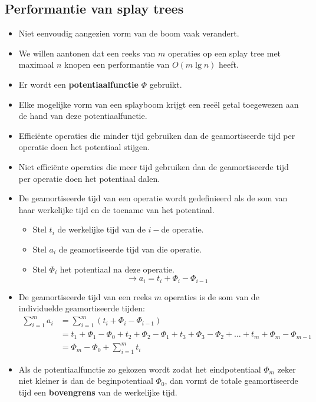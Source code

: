 \subsection{Performantie van splay trees}
\begin{itemize}
    \item Niet eenvoudig aangezien vorm van de boom vaak verandert.
    \item We willen aantonen dat een reeks van $m$ operaties op een splay tree met maximaal $n$ knopen een performantie van $O(m\lg n)$ heeft.
    \item Er wordt een \textbf{potentiaalfunctie} $\Phi$ gebruikt.
    \item Elke mogelijke vorm van een splayboom krijgt een reeël getal toegewezen aan de hand van deze potentiaalfunctie.
    \item Efficiënte operaties die minder tijd gebruiken dan de geamortiseerde tijd per operatie doen het potentiaal stijgen.
    \item Niet efficiënte operaties die meer tijd gebruiken dan de geamortiseerde tijd per operatie doen het potentiaal dalen.
    \item De geamortiseerde tijd van een operatie wordt gedefinieerd als de som van haar werkelijke tijd en de toename van het potentiaal.
    \begin{itemize}
        \item Stel $t_i$ de werkelijke tijd van de $i-$de operatie.
        \item Stel $a_i$ de geamortiseerde tijd van die operatie.
        \item Stel $\Phi_i$ het potentiaal na deze operatie.
        $$\rightarrow a_i = t_i + \Phi_{i} - \Phi_{i - 1}$$
    \end{itemize}
    \item De geamortiseerde tijd van een reeks $m$ operaties is de som van de individuelde geamortiseerde tijden:
    \begin{equation*}
        \begin{split}
            \sum_{i=1}^m a_i &= \sum_{i=1}^m (t_i + \Phi_{i} - \Phi_{i - 1}) \\
                             &= t_1 + \Phi_1 - \Phi_0 + t_2 + \Phi_2 - \Phi_1 + t_3 + \Phi_3 - \Phi_2 + \dots + t_m + \Phi_m - \Phi_{m - 1} \\
                             &= \Phi_{m} - \Phi_{0} + \sum_{i=1}^m t_i
        \end{split}
    \end{equation*}
    \item Als de potentiaalfunctie zo gekozen wordt zodat het eindpotentiaal $\Phi_m$ zeker niet kleiner is dan de beginpotentiaal $\Phi_0$, dan vormt de totale geamortiseerde tijd een \textbf{bovengrens} van de werkelijke tijd.

\end{itemize}
